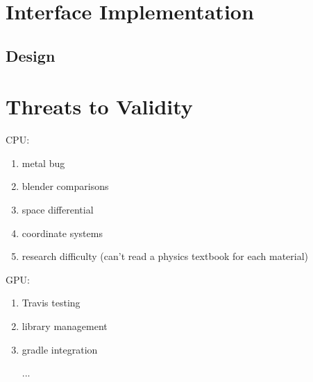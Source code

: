 \section{Interface Implementation} \label{ch:methods:interface}

\subsection{Design} \label{ch:methods:interface:design}

\section{Threats to Validity} \label{ch:methods:threats}

CPU:
\begin{enumerate}
  \item metal bug
  \item blender comparisons
  \item space differential
  \item coordinate systems
  \item research difficulty (can't read a physics textbook for each material)
\end{enumerate}

GPU:
\begin{enumerate}
  \item Travis testing
  \item library management
  \item gradle integration
  \item [...]
\end{enumerate}
